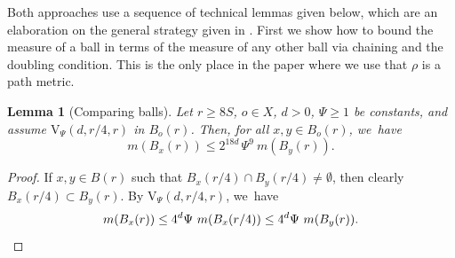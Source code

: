 \documentclass[JEP,XML,SOM,Unicode,published]{cedram}
\newcommand{\rV}{\mathrm{V}}
\theoremstyle{plain}
\newtheorem{lemma}[theorem]{Lemma}
\theoremstyle{definition}
\begin{document}
Both approaches use a sequence of technical lemmas given below, which are an elaboration on the general strategy given in \cite{SaloffC-01}. First we show how to bound the measure of a ball in terms of the measure of any other ball via chaining and the doubling condition. This is the only place in the paper where we use that $ \rho $ is a path metric.
\begin{lemma}[Comparing balls]\label{lem:ballcomparison}
Let {$r\ge 8S $}, $ o\in X $, $ d>0$, $\Psi\geq 1$ be constants,
and assume $\rV_\Psi (d,r/4,r)$ in $B_{o}(r)$. Then, for all $x,y\in B_o(r)$, we~have
\[
m(B_x(r))
\leq
2^{18d}\,
\Psi^{9}
\ m(B_{y}(r)).
\]
\end{lemma}
\begin{proof}
If $x, y\in B(r)$ such that $B_x(r/4)\cap B_y(r/4)\neq \emptyset$, then clearly $B_x(r/4)\subset B_y(r)$. By $\rV_\Psi(d,r/4,r)$, we~have
\[
m(B_x(r))
\\
\leq 4^d\Psi\ m(B_x(r/4))\leq 4^d\Psi\ m(B_y(r)).
\]


\end{proof}
\end{document}
